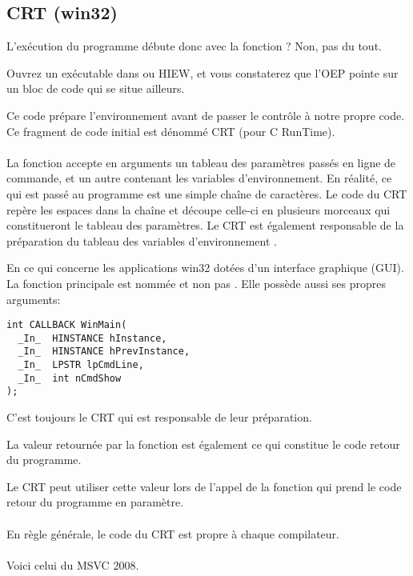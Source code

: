 ﻿\subsection{CRT (win32)}
\label{sec:CRT}

L'exécution du programme débute donc avec la fonction \main{}?
Non, pas du tout.

Ouvrez un exécutable dans \IDA ou HIEW, et vous constaterez que l'\ac{OEP} pointe sur un bloc de 
code qui se situe ailleurs.

Ce code prépare l'environnement avant de passer le contrôle à notre propre code. Ce fragment de code 
initial est dénommé CRT (pour C RunTime). \\
\\
La fonction \main{} accepte en arguments un tableau des paramètres passés en ligne de commande, et 
un autre contenant les variables d'environnement.
En réalité, ce qui est passé au programme est une simple chaîne de caractères. Le code du CRT repère 
les espaces dans la chaîne et découpe celle-ci en plusieurs morceaux qui constitueront le tableau des 
paramètres.
Le CRT est également responsable de la préparation du tableau des variables d'environnement .

En ce qui concerne les applications win32 dotées d'un interface graphique (\ac{GUI}). La fonction 
principale est nommée  et non pas \main{}. Elle possède aussi ses propres arguments:

\begin{lstlisting}[style=customc]
int CALLBACK WinMain(
  _In_  HINSTANCE hInstance,
  _In_  HINSTANCE hPrevInstance,
  _In_  LPSTR lpCmdLine,
  _In_  int nCmdShow
);
\end{lstlisting}

C'est toujours le CRT qui est responsable de leur préparation.

La valeur retournée par la fonction \main{} est également ce qui constitue le code retour du 
programme.

Le CRT peut utiliser cette valeur lors de l'appel de la fonction  qui prend le code 
retour du programme en paramètre. \\
\\
En règle générale, le code du CRT est propre à chaque compilateur. \\
\\
Voici celui du MSVC 2008.




